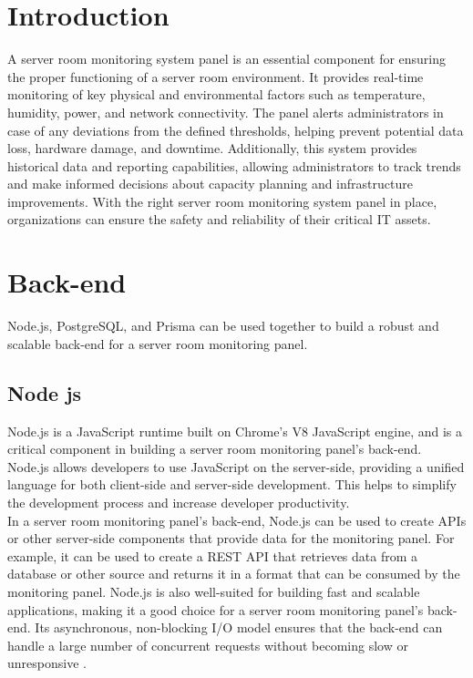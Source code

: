 \section{Introduction}
A server room monitoring system panel is an essential component for ensuring the proper functioning of a server room environment. It provides real-time monitoring of key physical and environmental factors such as temperature, humidity, power, and network connectivity. The panel alerts administrators in case of any deviations from the defined thresholds, helping prevent potential data loss, hardware damage, and downtime. Additionally, this system provides historical data and reporting capabilities, allowing administrators to track trends and make informed decisions about capacity planning and infrastructure improvements. With the right server room monitoring system panel in place, organizations can ensure the safety and reliability of their critical IT assets.
\section{Back-end}
Node.js, PostgreSQL, and Prisma can be used together to build a robust and scalable back-end for a server room monitoring panel.
    \subsection{Node js} 
    Node.js is a JavaScript runtime built on Chrome's V8 JavaScript engine, and is a critical component in building a server room monitoring panel's back-end. Node.js allows developers to use JavaScript on the server-side, providing a unified language for both client-side and server-side development. This helps to simplify the development process and increase developer productivity.\\
    In a server room monitoring panel's back-end, Node.js can be used to create APIs or other server-side components that provide data for the monitoring panel. For example, it can be used to create a REST API that retrieves data from a database or other source and returns it in a format that can be consumed by the monitoring panel. Node.js is also well-suited for building fast and scalable applications, making it a good choice for a server room monitoring panel's back-end. Its asynchronous, non-blocking I/O model ensures that the back-end can handle a large number of concurrent requests without becoming slow or unresponsive \cite{nodejs}.
